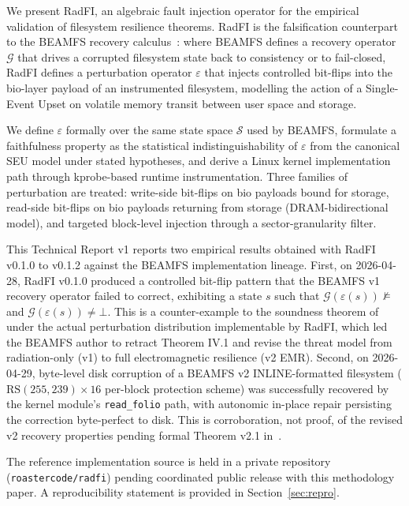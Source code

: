 We present RadFI, an algebraic fault injection operator for the
empirical validation of filesystem resilience theorems. RadFI is the
falsification counterpart to the BEAMFS recovery
calculus~\cite{desbrieres2026beamfsv1}: where BEAMFS defines a
recovery operator \(\mathcal{G}\) that drives a corrupted filesystem
state back to consistency or to fail-closed, RadFI defines a
perturbation operator \(\varepsilon\) that injects controlled
bit-flips into the bio-layer payload of an instrumented filesystem,
modelling the action of a Single-Event Upset on volatile memory
transit between user space and storage.

We define \(\varepsilon\) formally over the same state space
\(\mathcal{S}\) used by BEAMFS, formulate a faithfulness property as
the statistical indistinguishability of \(\varepsilon\) from the
canonical SEU model under stated hypotheses, and derive a Linux
kernel implementation path through kprobe-based runtime
instrumentation. Three families of perturbation are treated:
write-side bit-flips on bio payloads bound for storage, read-side
bit-flips on bio payloads returning from storage (DRAM-bidirectional
model), and targeted block-level injection through a
sector-granularity filter.

This Technical Report v1 reports two empirical results obtained with
RadFI v0.1.0 to v0.1.2 against the BEAMFS implementation lineage.
First, on 2026-04-28, RadFI v0.1.0 produced a controlled bit-flip
pattern that the BEAMFS v1 recovery operator failed to correct,
exhibiting a state \(s\) such that
\(\mathcal{G}(\varepsilon(s)) \not\models\) and
\(\mathcal{G}(\varepsilon(s)) \neq \bot\). This is a counter-example
to the soundness theorem of~\cite{desbrieres2026beamfsv1} under the
actual perturbation distribution implementable by RadFI, which led
the BEAMFS author to retract Theorem IV.1 and revise the threat
model from radiation-only (v1) to full electromagnetic resilience
(v2 EMR). Second, on 2026-04-29, byte-level disk corruption of a
BEAMFS v2 INLINE-formatted filesystem
(\(\mathrm{RS}(255,239) \times 16\) per-block protection scheme)
was successfully recovered by the kernel module's
\texttt{read\_folio} path, with autonomic in-place repair persisting
the correction byte-perfect to disk. This is corroboration, not
proof, of the revised v2 recovery properties pending formal Theorem
v2.1 in~\cite{desbrieres2026beamfsv2}.

The reference implementation source is held in a private repository
(\texttt{roastercode/radfi}) pending coordinated public release
with this methodology paper. A reproducibility statement is provided in
Section~\ref{sec:repro}.

